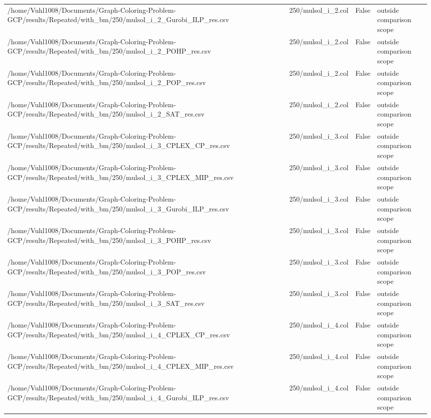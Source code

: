 \begin{table}[htbp]
\begin{tabular}{llll}
/home/Vuhl1008/Documents/Graph-Coloring-Problem-GCP/results/Repeated/with\_bm/250/mulsol\_i\_2\_Gurobi\_ILP\_res.csv & 250/mulsol\_i\_2.col & False & outside comparison scope \\
/home/Vuhl1008/Documents/Graph-Coloring-Problem-GCP/results/Repeated/with\_bm/250/mulsol\_i\_2\_POHP\_res.csv & 250/mulsol\_i\_2.col & False & outside comparison scope \\
/home/Vuhl1008/Documents/Graph-Coloring-Problem-GCP/results/Repeated/with\_bm/250/mulsol\_i\_2\_POP\_res.csv & 250/mulsol\_i\_2.col & False & outside comparison scope \\
/home/Vuhl1008/Documents/Graph-Coloring-Problem-GCP/results/Repeated/with\_bm/250/mulsol\_i\_2\_SAT\_res.csv & 250/mulsol\_i\_2.col & False & outside comparison scope \\
/home/Vuhl1008/Documents/Graph-Coloring-Problem-GCP/results/Repeated/with\_bm/250/mulsol\_i\_3\_CPLEX\_CP\_res.csv & 250/mulsol\_i\_3.col & False & outside comparison scope \\
/home/Vuhl1008/Documents/Graph-Coloring-Problem-GCP/results/Repeated/with\_bm/250/mulsol\_i\_3\_CPLEX\_MIP\_res.csv & 250/mulsol\_i\_3.col & False & outside comparison scope \\
/home/Vuhl1008/Documents/Graph-Coloring-Problem-GCP/results/Repeated/with\_bm/250/mulsol\_i\_3\_Gurobi\_ILP\_res.csv & 250/mulsol\_i\_3.col & False & outside comparison scope \\
/home/Vuhl1008/Documents/Graph-Coloring-Problem-GCP/results/Repeated/with\_bm/250/mulsol\_i\_3\_POHP\_res.csv & 250/mulsol\_i\_3.col & False & outside comparison scope \\
/home/Vuhl1008/Documents/Graph-Coloring-Problem-GCP/results/Repeated/with\_bm/250/mulsol\_i\_3\_POP\_res.csv & 250/mulsol\_i\_3.col & False & outside comparison scope \\
/home/Vuhl1008/Documents/Graph-Coloring-Problem-GCP/results/Repeated/with\_bm/250/mulsol\_i\_3\_SAT\_res.csv & 250/mulsol\_i\_3.col & False & outside comparison scope \\
/home/Vuhl1008/Documents/Graph-Coloring-Problem-GCP/results/Repeated/with\_bm/250/mulsol\_i\_4\_CPLEX\_CP\_res.csv & 250/mulsol\_i\_4.col & False & outside comparison scope \\
/home/Vuhl1008/Documents/Graph-Coloring-Problem-GCP/results/Repeated/with\_bm/250/mulsol\_i\_4\_CPLEX\_MIP\_res.csv & 250/mulsol\_i\_4.col & False & outside comparison scope \\
/home/Vuhl1008/Documents/Graph-Coloring-Problem-GCP/results/Repeated/with\_bm/250/mulsol\_i\_4\_Gurobi\_ILP\_res.csv & 250/mulsol\_i\_4.col & False & outside comparison scope \\

\end{tabular}
\end{table}
